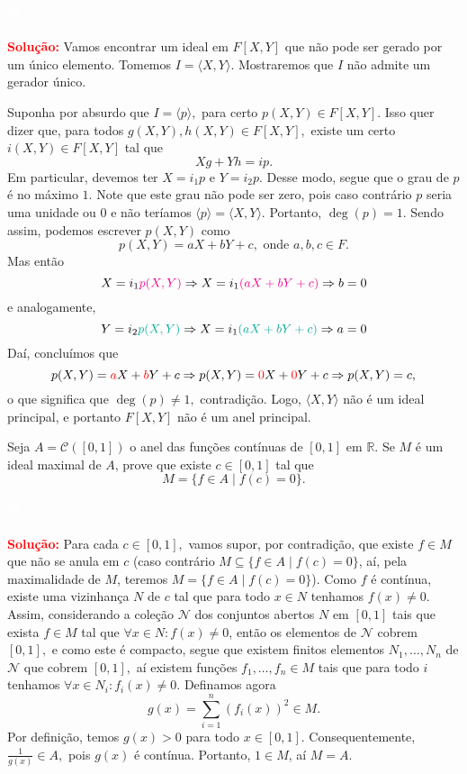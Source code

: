 \documentclass[11pt,a4paper]{article}
\newcounter{exercicio}[section]
\newcommand{\solucao}[1]{
\textbf{\textcolor{white}{oi}\\ \\ \textcolor{red}{Solução:}} #1}
\begin{document}
\solucao{Vamos encontrar um ideal em $F[X, Y]$ que não pode ser gerado por um único elemento. Tomemos $I = \langle X, Y \rangle.$ Mostraremos que $I$ não admite um gerador único.

Suponha por absurdo que $I = \langle p \rangle,$ para certo $p(X,Y) \in F[X,Y].$ Isso quer dizer que, para todos $g(X,Y), h(X,Y) \in F[X,Y],$ existe um certo $i(X,Y) \in F[X,Y]$ tal que
\[
Xg + Yh = ip.
\]
Em particular, devemos ter $X = i_1p$ e $Y = i_2p.$ Desse modo, segue que o grau de $p$ é no máximo $1.$ Note que este grau não pode ser zero, pois caso contrário $p$ seria uma unidade ou $0$ e não teríamos $\langle p \rangle = \langle X,Y \rangle.$ Portanto, $\deg(p) = 1.$ Sendo assim, podemos escrever $p(X,Y)$ como
\[
p(X,Y) = aX + bY + c, \mbox{ onde } a,b,c \in F.
\]
Mas então
\[
X = i_1\textcolor{Magenta}{p(X,Y)} \Rightarrow X = i_1\textcolor{Magenta}{(aX + bY + c)} \Rightarrow b = 0
\]
e analogamente, 
\[
Y = i_2\textcolor{JungleGreen}{p(X,Y)} \Rightarrow X = i_1\textcolor{JungleGreen}{(aX + bY + c)} \Rightarrow a = 0
\]
Daí, concluímos que
\[
p(X,Y) = \textcolor{red}{a}X +  \textcolor{red}{b}Y + c \Rightarrow p(X,Y) = \textcolor{red}{0}X +  \textcolor{red}{0}Y + c \Rightarrow p(X,Y) = c,
\]
o que significa que $\deg(p) \neq 1,$ contradição.
Logo, $\langle X, Y \rangle$ não é um ideal principal, e portanto $F[X,Y]$ não é um anel principal.
}
 Seja $A = \mathcal{C}([0, 1])$ o anel das funções contínuas de $[0, 1]$ em $\mathbb{R}.$ Se $M$ é um ideal maximal de $A$, prove que existe $c \in [0, 1]$ tal que \[M = \{f \in A \mid f(c) = 0\}.\]
\solucao{%
Para cada $c \in [0,1],$ vamos supor, por contradição, que existe $f \in M$ que não se anula em $c$ (caso contrário $M \subseteq \{f \in A \mid f(c) = 0\}$, aí, pela maximalidade de $M$, teremos $M = \{f \in A \mid f(c) = 0\}$). Como $f$ é contínua, existe uma vizinhança $N$ de $c$ tal que para todo $x\in N$ tenhamos $f(x) \neq 0.$ Assim, considerando a coleção $\mathcal{N}$ dos conjuntos abertos $N$ em $[0,1]$ tais que exista $f\in M$ tal que $\forall x\in N:f(x)\neq 0$, então os elementos de $\mathcal{N}$ cobrem $[0,1],$ e como este é compacto, segue que existem finitos elementos $N_1, \ldots, N_n$ de $\mathcal{N}$ que cobrem $[0,1],$ aí existem funções $f_1,\dots,f_n\in M$ tais que para todo $i$ tenhamos $\forall x\in N_i:f_i(x)\neq 0$. Definamos agora
\[
g(x) = \sum\limits_{i=1}^n (f_i(x))^2 \in M.
\]
Por definição, temos $g(x) > 0$ para todo $x \in [0,1].$ Consequentemente, $\frac{1}{g(x)} \in A,$ pois $g(x)$ é contínua. Portanto, $1 \in M$, aí $M = A.$  
}
\end{document}
